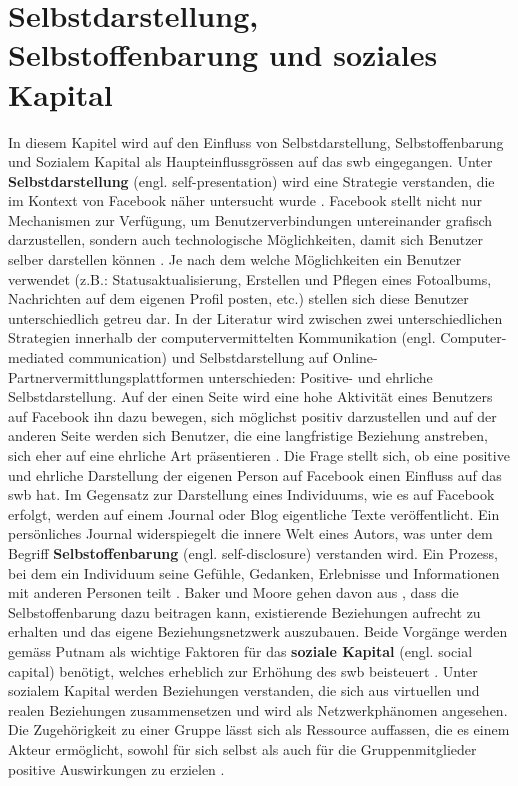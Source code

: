 \section{Selbstdarstellung, Selbstoffenbarung und soziales Kapital}\label{sub.selfp}
In diesem Kapitel wird auf den Einfluss von Selbstdarstellung, Selbstoffenbarung und Sozialem Kapital als Haupteinflussgrössen auf das \gls{swb} eingegangen. \newline
Unter \textbf{Selbstdarstellung} (engl. self-presentation) wird eine Strategie verstanden, die im Kontext von Facebook näher untersucht wurde \cite{Kim:2011}. Facebook stellt nicht nur Mechanismen zur Verfügung, um Benutzerverbindungen untereinander grafisch darzustellen, sondern auch technologische Möglichkeiten, damit sich Benutzer selber darstellen können \cite{Ellison:2007.1}. Je nach dem welche Möglichkeiten ein Benutzer verwendet (z.B.: Statusaktualisierung, Erstellen und Pflegen eines Fotoalbums, Nachrichten auf dem eigenen Profil posten, etc.) stellen sich diese Benutzer unterschiedlich getreu dar. In der Literatur wird zwischen zwei unterschiedlichen Strategien innerhalb der computervermittelten Kommunikation (engl. Computer-mediated communication) \cite{Tidwell:2002} und Selbstdarstellung auf Online-Partnervermittlungsplattformen \cite{Gibbs:2006}  unterschieden: Positive- und ehrliche Selbstdarstellung. Auf der einen Seite wird eine hohe Aktivität eines Benutzers auf Facebook ihn dazu bewegen, sich möglichst positiv darzustellen \cite{Kimmerle:2008} und auf der anderen Seite werden sich Benutzer, die eine langfristige Beziehung anstreben, sich eher auf eine ehrliche Art präsentieren \cite{Gibbs:2006}. Die Frage stellt sich, ob eine positive und ehrliche Darstellung der eigenen Person auf Facebook einen Einfluss auf das \gls{swb} hat.\newline
Im Gegensatz zur Darstellung eines Individuums, wie es auf Facebook erfolgt, werden auf einem Journal oder Blog eigentliche Texte veröffentlicht. Ein persönliches Journal widerspiegelt die innere Welt eines Autors, was unter dem Begriff \textbf{Selbstoffenbarung} (engl. self-disclosure) verstanden wird. Ein Prozess, bei dem ein Individuum seine Gefühle, Gedanken, Erlebnisse und Informationen mit anderen Personen teilt \cite{Derlega:1993}. Baker und Moore gehen davon aus \cite{Baker:2008}, dass die Selbstoffenbarung dazu beitragen kann, existierende Beziehungen aufrecht zu erhalten und das eigene Beziehungsnetzwerk auszubauen. Beide Vorgänge werden gemäss Putnam \cite{Putnam:2000} als wichtige Faktoren für das \textbf{soziale Kapital} (engl. social capital) benötigt, welches erheblich zur Erhöhung des \gls{swb} beisteuert \cite{Sirgy:2006}. Unter sozialem Kapital werden Beziehungen verstanden, die sich aus virtuellen und realen Beziehungen zusammensetzen \cite{Ellison:2007} und wird als Netzwerkphänomen angesehen. Die Zugehörigkeit zu einer Gruppe lässt sich als Ressource auffassen, die es einem Akteur ermöglicht, sowohl für sich selbst als auch für die Gruppenmitglieder positive Auswirkungen zu erzielen \cite{Bourdieu:1983}.\newline
